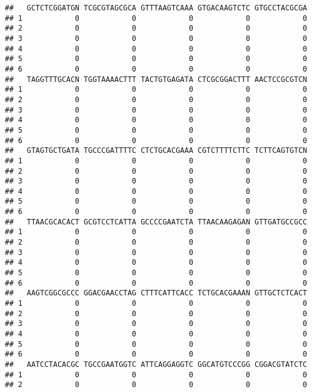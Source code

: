 \documentclass[]{article}
\begin{document}
\begin{verbatim}
##   GCTCTCGGATGN TCGCGTAGCGCA GTTTAAGTCAAA GTGACAAGTCTC GTGCCTACGCGA
## 1            0            0            0            0            0
## 2            0            0            0            0            0
## 3            0            0            0            0            0
## 4            0            0            0            0            0
## 5            0            0            0            0            0
## 6            0            0            0            0            0
##   TAGGTTTGCACN TGGTAAAACTTT TACTGTGAGATA CTCGCGGACTTT AACTCCGCGTCN
## 1            0            0            0            0            0
## 2            0            0            0            0            0
## 3            0            0            0            0            0
## 4            0            0            0            0            0
## 5            0            0            0            0            0
## 6            0            0            0            0            0
##   GTAGTGCTGATA TGCCCGATTTTC CTCTGCACGAAA CGTCTTTTCTTC TCTTCAGTGTCN
## 1            0            0            0            0            0
## 2            0            0            0            0            0
## 3            0            0            0            0            0
## 4            0            0            0            0            0
## 5            0            0            0            0            0
## 6            0            0            0            0            0
##   TTAACGCACACT GCGTCCTCATTA GCCCCGAATCTA TTAACAAGAGAN GTTGATGCCGCC
## 1            0            0            0            0            0
## 2            0            0            0            0            0
## 3            0            0            0            0            0
## 4            0            0            0            0            0
## 5            0            0            0            0            0
## 6            0            0            0            0            0
##   AAGTCGGCGCCC GGACGAACCTAG CTTTCATTCACC TCTGCACGAAAN GTTGCTCTCACT
## 1            0            0            0            0            0
## 2            0            0            0            0            0
## 3            0            0            0            0            0
## 4            0            0            0            0            0
## 5            0            0            0            0            0
## 6            0            0            0            0            0
##   AATCCTACACGC TGCCGAATGGTC ATTCAGGAGGTC GGCATGTCCCGG CGGACGTATCTC
## 1            0            0            0            0            0
## 2            0            0            0            0            0

\end{verbatim}
\end{document}
